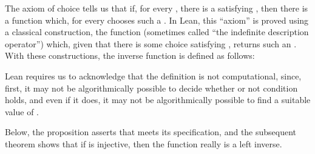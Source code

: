 \documentclass[letterpaper,10pt,english]{sphinxmanual}
\begin{document}
\sphinxAtStartPar
The axiom of choice tells us that if, for every ,
there is a  satisfying ,
then there is a function  which,
for every  chooses such a .
In Lean, this “axiom” is proved using a classical construction,
the  function
(sometimes called “the indefinite description operator”) which,
given that there is some choice  satisfying ,
returns such an .
With these constructions, the inverse function is defined as follows:

\begin{sphinxVerbatim}[commandchars=\\\{\}]
 
  

    

               
                
\end{sphinxVerbatim}

\sphinxAtStartPar
Lean requires us to acknowledge that the definition is not computational, since, first, it may not be algorithmically possible to decide whether or not condition  holds, and even if it does, it may not be algorithmically possible to find a suitable value of .

\sphinxAtStartPar
Below, the proposition  asserts that  meets its specification, and the subsequent theorem shows that if  is injective, then the  function really is a left inverse.
\end{document}
